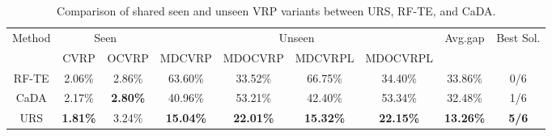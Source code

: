 \documentclass{article}
\theoremstyle{plain}
\theoremstyle{definition}
\theoremstyle{remark}
\begin{document}
\begin{table}[h!]
  \centering
  \caption{Comparison of shared seen and unseen VRP variants between URS, RF-TE, and CaDA.}
    \begin{tabular}{c|c|c|c|c|c|c|c|c}
    \toprule[0.5mm]
    \multirow{2}[2]{*}{Method} & \multicolumn{2}{c|}{Seen} & \multicolumn{4}{c|}{Unseen}   & \multirow{2}[2]{*}{Avg.gap} & \multirow{2}[2]{*}{Best Sol.} \\
          & CVRP  & OCVRP & MDCVRP & MDOCVRP & MDCVRPL & MDOCVRPL &       &  \\
    \midrule
    RF-TE & 2.06\% & 2.86\% & 63.60\% & 33.52\% & 66.75\% & 34.40\% & 33.86\% & 0/6 \\
    CaDA  & 2.17\% & \cellcolor[HTML]{D0CECE}\textbf{2.80\%} & 40.96\% & 53.21\% & 42.40\% & 53.34\% & 32.48\% & 1/6 \\
    URS   & \cellcolor[HTML]{D0CECE}\textbf{1.81\%} & 3.24\% & \cellcolor[HTML]{D0CECE}\textbf{15.04\%} & \cellcolor[HTML]{D0CECE}\textbf{22.01\%} & \cellcolor[HTML]{D0CECE}\textbf{15.32\%} & \cellcolor[HTML]{D0CECE}\textbf{22.15\%} & \cellcolor[HTML]{D0CECE}\textbf{13.26\%} & \cellcolor[HTML]{D0CECE}\textbf{5/6} \\
    \bottomrule[0.5mm]
    \end{tabular}%
  \label{tab:RF_CaDA_official}%
\end{table}%
\end{document}
